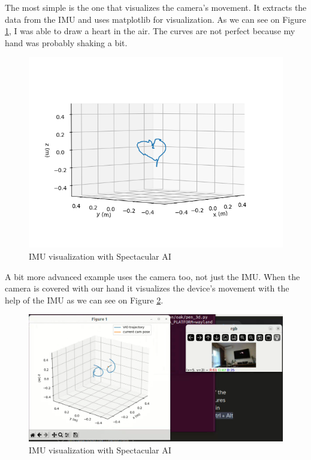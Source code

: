 The most simple is the one that visualizes the camera's movement. It extracts the data from the IMU and uses matplotlib for visualization. As we can see on Figure \ref{fig:IMU_visu}, I was able to draw a heart in the air. The curves are not perfect because my hand was probably shaking a bit.

\begin{figure}[H]
	\centering
	\includegraphics[width=150mm, keepaspectratio]{figures/spectacular_ai_vio_visu.png}
	\caption{IMU visualization with Spectacular AI}
	\label{fig:IMU_visu}
\end{figure}

A bit more advanced example uses the camera too, not just the IMU. When the camera is covered with our hand it visualizes the device's movement with the help of the IMU as we can see on Figure \ref{fig:3d_pen}.

\begin{figure}[H]
	\centering
	\includegraphics[width=150mm, keepaspectratio]{figures/3d_pen.png}
	\caption{IMU visualization with Spectacular AI}
	\label{fig:3d_pen}
\end{figure}

